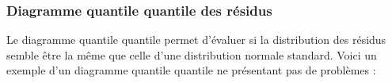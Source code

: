 \documentclass[french]{article}
\begin{document}
\begin{multicols*}{2}
\begin{center}
\end{center}


\subsubsection{Diagramme quantile quantile des résidus}
Le diagramme quantile quantile permet d'évaluer si la distribution des résidus semble être la même que celle d'une distribution normale standard. Voici un exemple d'un diagramme quantile quantile ne présentant pas de problèmes : 
\begin{center}



\begin{tikzpicture}[x=0.75pt,y=0.75pt,yscale=-1,xscale=1]


\end{tikzpicture}
\end{center}
\end{multicols*}
\end{document}
